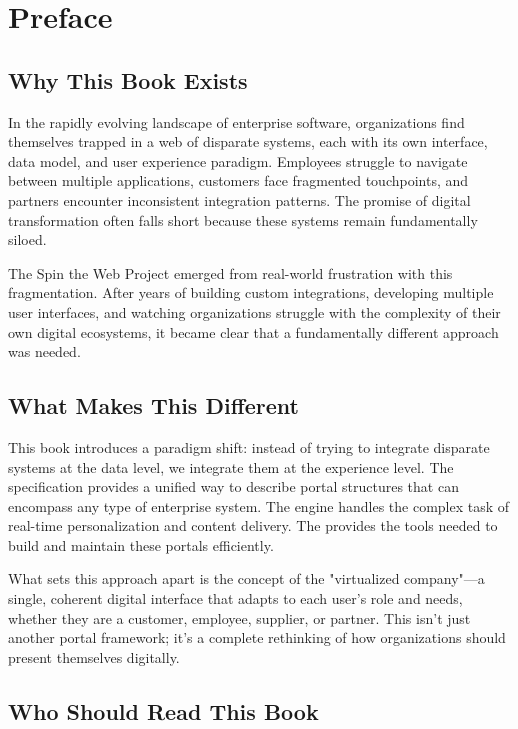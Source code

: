 
\chapter*{Preface}

\section*{Why This Book Exists}

In the rapidly evolving landscape of enterprise software, organizations find themselves trapped in a web of disparate systems, each with its own interface, data model, and user experience paradigm. Employees struggle to navigate between multiple applications, customers face fragmented touchpoints, and partners encounter inconsistent integration patterns. The promise of digital transformation often falls short because these systems remain fundamentally siloed.

The Spin the Web Project emerged from real-world frustration with this fragmentation. After years of building custom integrations, developing multiple user interfaces, and watching organizations struggle with the complexity of their own digital ecosystems, it became clear that a fundamentally different approach was needed.

\section*{What Makes This Different}

This book introduces a paradigm shift: instead of trying to integrate disparate systems at the data level, we integrate them at the experience level. The \wbdl specification provides a unified way to describe portal structures that can encompass any type of enterprise system. The \webspinner engine handles the complex task of real-time personalization and content delivery. The \studio provides the tools needed to build and maintain these portals efficiently.

What sets this approach apart is the concept of the "virtualized company"—a single, coherent digital interface that adapts to each user's role and needs, whether they are a customer, employee, supplier, or partner. This isn't just another portal framework; it's a complete rethinking of how organizations should present themselves digitally.

\section*{Who Should Read This Book}

